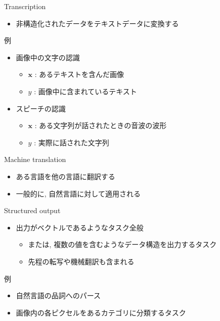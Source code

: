 \documentclass[dvipdfmx, 10pt]{beamer}
\newcommand{\green}[1]{\textcolor{green!40!black}{#1}}
\begin{document}
\begin{frame}{Transcription}
  \begin{itemize}
    \item 非構造化されたデータをテキストデータに変換する
  \end{itemize}
  \begin{exampleblock}{例}
    \begin{itemize}
      \item 画像中の文字の認識
      \begin{itemize}
        \item $\bm{x}$ : あるテキストを含んだ画像
        \item $y$ : 画像中に含まれているテキスト
      \end{itemize}
      \item スピーチの認識
      \begin{itemize}
        \item $\bm{x}$ : ある文字列が話されたときの音波の波形
        \item $y$ : 実際に話された文字列
      \end{itemize}
    \end{itemize}
  \end{exampleblock}
\end{frame}


\begin{frame}{Machine translation}
  \begin{itemize}
    \item ある言語を他の言語に翻訳する
    \item 一般的に, 自然言語に対して適用される
  \end{itemize}
\end{frame}


\begin{frame}{Structured output}
  \begin{itemize}
    \item 出力がベクトルであるようなタスク全般
    \begin{itemize}
      \item または, 複数の値を含むようなデータ構造を出力するタスク
      \item 先程の転写や機械翻訳も含まれる
    \end{itemize}
  \end{itemize}
  \begin{exampleblock}{例}
    \begin{itemize}
      \item 自然言語の品詞へのパース
      \item 画像内の各ピクセルをあるカテゴリに分類するタスク
    \end{itemize}
  \end{exampleblock}
\end{frame}
\end{document}
